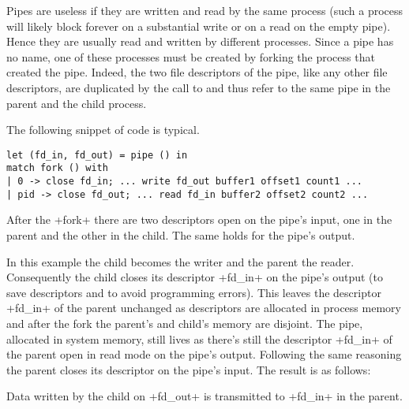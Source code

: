 Pipes are useless if they are written and read by the same process
(such a process will likely block forever on a substantial write or on
a read on the empty pipe). Hence they are usually read and written by
different processes. Since a pipe has no name, one of these processes
must be created by forking the process that created the pipe. Indeed,
the two file descriptors of the pipe, like any other file descriptors,
are duplicated by the call to  and thus refer to the
same pipe in the parent and the child process.
\begin{example} The following snippet of code is typical.
%
\begin{lstlisting}
let (fd_in, fd_out) = pipe () in
match fork () with
| 0 -> close fd_in; ... write fd_out buffer1 offset1 count1 ...
| pid -> close fd_out; ... read fd_in buffer2 offset2 count2 ...
\end{lstlisting}
% 
After the \ml+fork+ there are two descriptors open on the pipe's
input, one in the parent and the other in the child. The same
holds for the pipe's output.
%
\begin{myimage}[width="45\%"]
\end{myimage}
% 
In this example the child becomes the writer and the parent the
reader. Consequently the child closes its descriptor \ml+fd_in+ on the
pipe's output (to save descriptors and to avoid programming
errors). This leaves the descriptor \ml+fd_in+ of the parent unchanged
as descriptors are allocated in process memory and after the fork the
parent's and child's memory are disjoint. The pipe, allocated in system
memory, still lives as there's still the descriptor \ml+fd_in+ of the
parent open in read mode on the pipe's output. Following the same
reasoning the parent closes its descriptor on the pipe's input. The
result is as follows:
%
\begin{myimage}[width="45\%"]
\end{myimage}
% 
Data written by the child on \ml+fd_out+ is transmitted to \ml+fd_in+
in 
the parent.
\end{example}
